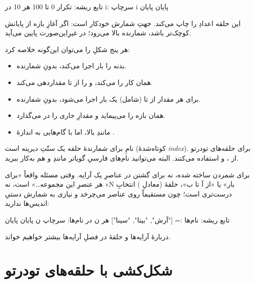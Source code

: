 \begin{salamfa}
تابع ریشه:
    تکرار 0 تا 100 هر 10 در i:
        سرچاپ i
    پایان
پایان
\end{salamfa}

این حلقه اعدادِ  را چاپ می‌کند. جهتِ شمارش خودکار
است: اگر آغازِ بازه از پایانش کوچک‌تر باشد، شمارنده بالا می‌رود؛ در
غیرِاین‌صورت پایین می‌آید.

هر پنج شکلِ  را می‌توان این‌گونه خلاصه کرد:

\begin{itemize}
  \item {} بدنه را  بار اجرا می‌کند، بدونِ شمارنده.
  \item {} همان کار را می‌کند، و  را از 
        تا  مقداردهی می‌کند.
  \item {} برای هر مقدار از  تا  (شامل) یک
        بار اجرا می‌شود، بدونِ شمارنده.
  \item {} همان بازه را می‌پیماید و مقدارِ جاری را در
         می‌گذارد.
  \item {} مانندِ بالا، اما با گام‌هایی به
        اندازهٔ .
\end{itemize}

\begin{tip}
نامِ  برای شمارندهٔ حلقه یک سنّتِ دیرینه است (کوتاه‌شدهٔ \emph{index}).
برای حلقه‌های تودرتو از ،  و  استفاده می‌کنند. البته
می‌توانید نام‌های فارسیِ گویاتر مانندِ  و  هم به‌کار
ببرید.
\end{tip}

\begin{note}
 برای شمردن ساخته شده، نه برای گشتن در عناصرِ یک آرایه. وقتی
مسئله واقعاً «برای هر عنصرِ این مجموعه\ldots» است، نه «N بار» یا «از آ تا ب»،
حلقهٔ  (معادلِ ) انتخابِ درست‌تری است؛ چون مستقیماً روی
عناصر می‌چرخد و نیازی به شمارش دستیِ اندیس‌ها ندارید:

\begin{salamfa}
تابع ریشه:
    نام‌ها := ["آرش", "بیتا", "سینا"]
    هر ن در نام‌ها:
        سرچاپ ن
    پایان
پایان
\end{salamfa}

دربارهٔ آرایه‌ها و حلقهٔ  در فصلِ آرایه‌ها بیشتر خواهیم خواند.
\end{note}

\section{شکل‌کشی با حلقه‌های تودرتو}

